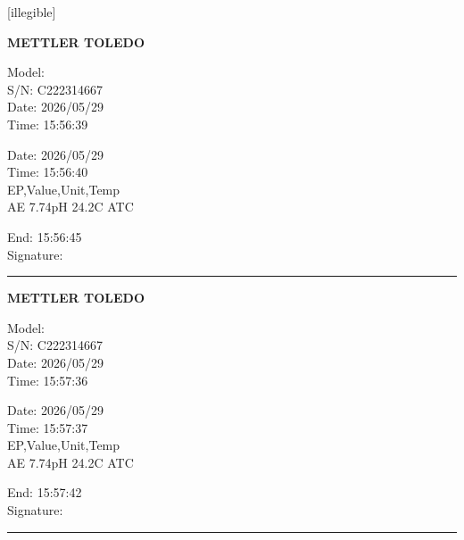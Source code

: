 \documentclass[UTF8,10pt,a4paper,fontset=fandol]{ctexart}
\newcommand{\fieldvalue}[1]{#1}
\newcommand{\handwritten}[1]{#1}
\begin{document}
\begin{minipage}[t]{0.47\linewidth}
\handwritten{[illegible]}

\textbf{METTLER TOLEDO}

\noindent
Model: \\
S/N: \fieldvalue{C222314667}\\
Date: \fieldvalue{2026/05/29}\\
Time: \fieldvalue{15:56:39}

\medskip
\noindent
Date: \fieldvalue{2026/05/29}\\
Time: \fieldvalue{15:56:40}\\
EP,Value,Unit,Temp\\
\fieldvalue{AE 7.74pH 24.2\textdegree C ATC}

\medskip
End: \fieldvalue{15:56:45}\\
Signature: \rule{0.72\linewidth}{0.4pt}

\vspace{1.5cm}

\textbf{METTLER TOLEDO}

\noindent
Model: \\
S/N: \fieldvalue{C222314667}\\
Date: \fieldvalue{2026/05/29}\\
Time: \fieldvalue{15:57:36}

\medskip
\noindent
Date: \fieldvalue{2026/05/29}\\
Time: \fieldvalue{15:57:37}\\
EP,Value,Unit,Temp\\
\fieldvalue{AE 7.74pH 24.2\textdegree C ATC}

\medskip
End: \fieldvalue{15:57:42}\\
Signature: \rule{0.72\linewidth}{0.4pt}


\end{minipage}
\end{document}
